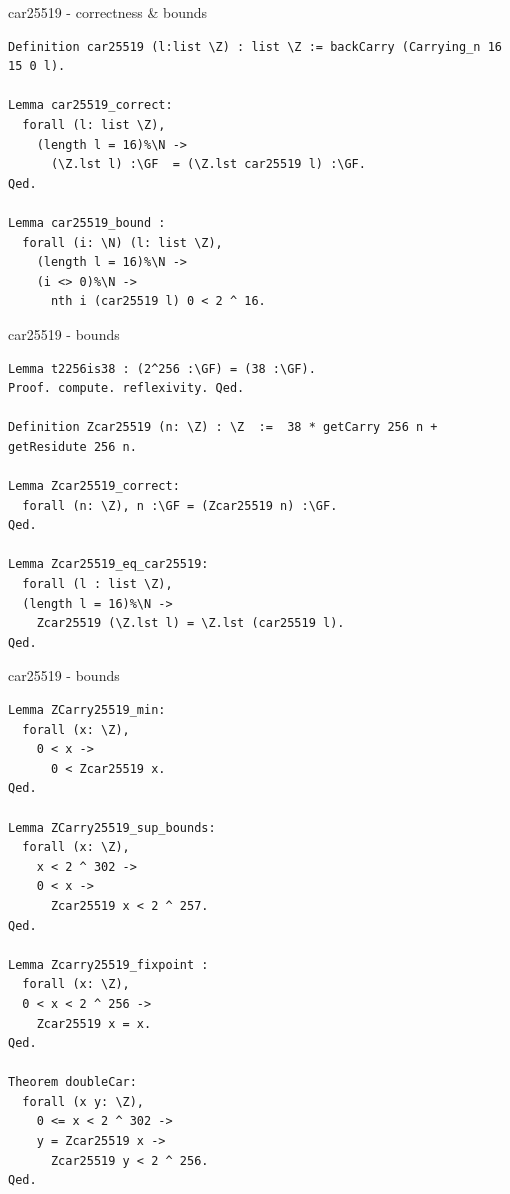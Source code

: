 \documentclass[8pt]{beamer}
\begin{document}
%
%

\begin{frame}[fragile]{car25519 - correctness \& bounds}
  \begin{center}
\begin{lstlisting}[language=Coq, caption=car25519 | Proofs of correctness, label=cod:languageC171]
Definition car25519 (l:list \Z) : list \Z := backCarry (Carrying_n 16 15 0 l).

Lemma car25519_correct:
  forall (l: list \Z),
    (length l = 16)%\N ->
      (\Z.lst l) :\GF  = (\Z.lst car25519 l) :\GF.
Qed.

Lemma car25519_bound :
  forall (i: \N) (l: list \Z),
    (length l = 16)%\N ->
    (i <> 0)%\N ->
      nth i (car25519 l) 0 < 2 ^ 16.
\end{lstlisting}
  \end{center}
\end{frame}



%
%

\begin{frame}[fragile]{car25519 - bounds}
  \begin{center}
\begin{lstlisting}[language=Coq, caption=car25519, label=cod:languageC181]
Lemma t2256is38 : (2^256 :\GF) = (38 :\GF).
Proof. compute. reflexivity. Qed.

Definition Zcar25519 (n: \Z) : \Z  :=  38 * getCarry 256 n +  getResidute 256 n.

Lemma Zcar25519_correct:
  forall (n: \Z), n :\GF = (Zcar25519 n) :\GF.
Qed.

Lemma Zcar25519_eq_car25519:
  forall (l : list \Z),
  (length l = 16)%\N ->
    Zcar25519 (\Z.lst l) = \Z.lst (car25519 l).
Qed.
\end{lstlisting}

  \end{center}
\end{frame}


%
%

\begin{frame}[fragile]{car25519 - bounds}
  \begin{center}
\begin{lstlisting}[language=Coq, caption=car25519, label=cod:languageC191]
Lemma ZCarry25519_min:
  forall (x: \Z),
    0 < x ->
      0 < Zcar25519 x.
Qed.

Lemma ZCarry25519_sup_bounds:
  forall (x: \Z),
    x < 2 ^ 302 ->
    0 < x ->
      Zcar25519 x < 2 ^ 257.
Qed.

Lemma Zcarry25519_fixpoint :
  forall (x: \Z),
  0 < x < 2 ^ 256 ->
    Zcar25519 x = x.
Qed.

Theorem doubleCar:
  forall (x y: \Z),
    0 <= x < 2 ^ 302 ->
    y = Zcar25519 x ->
      Zcar25519 y < 2 ^ 256.
Qed.
\end{lstlisting}

  \end{center}
\end{frame}
\end{document}
